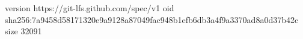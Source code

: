 version https://git-lfs.github.com/spec/v1
oid sha256:7a9458d58171320e9a9128a87049fac948b1efb6db3a4f9a3370ad8a0d37b42c
size 32091
